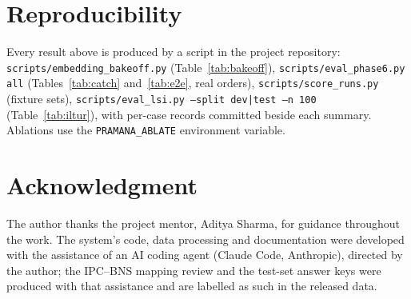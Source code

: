 \documentclass[conference]{IEEEtran}
\begin{document}
\section*{Reproducibility}
Every result above is produced by a script in the project repository: \texttt{scripts/embedding\_bakeoff.py} (Table~\ref{tab:bakeoff}), \texttt{scripts/eval\_phase6.py all} (Tables~\ref{tab:catch} and~\ref{tab:e2e}, real orders), \texttt{scripts/score\_runs.py} (fixture sets), \texttt{scripts/eval\_lsi.py --split dev|test --n 100} (Table~\ref{tab:iltur}), with per-case records committed beside each summary. Ablations use the \texttt{PRAMANA\_ABLATE} environment variable.

\section*{Acknowledgment}
The author thanks the project mentor, Aditya Sharma, for guidance throughout the work. The system's code, data processing and documentation were developed with the assistance of an AI coding agent (Claude Code, Anthropic), directed by the author; the IPC--BNS mapping review and the test-set answer keys were produced with that assistance and are labelled as such in the released data.
\end{document}
